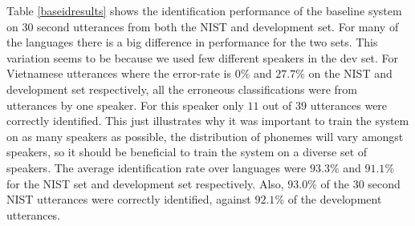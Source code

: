 Table \ref{baseidresults} shows the identification performance of the baseline system on 30 second utterances from both the NIST and development set. For many of the languages there is a big difference in performance for the two sets. This variation seems to be because we used few different speakers in the dev set. For Vietnamese utterances where the error-rate is $0$\% and $27.7$\% on the NIST and development set respectively, all the erroneous classifications were from utterances by one speaker. For this speaker only $11$ out of $39$ utterances were correctly identified. This just illustrates why it was important to train the system on as many speakers as possible, the distribution of phonemes will vary amongst speakers, so it should be beneficial to train the system on a diverse set of speakers. The average identification rate over languages were $93.3$\% and $91.1$\% for the NIST set and development set respectively. Also, $93.0$\% of the 30 second NIST utterances were correctly identified, against $92.1$\% of the development utterances. 
